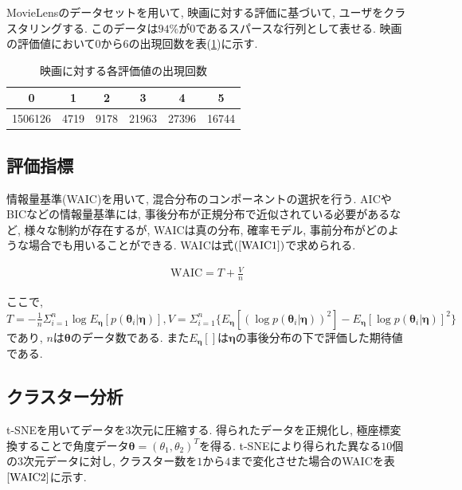 \documentclass[a4j,12pt]{jarticle}
\begin{document}
MovieLensのデータセットを用いて, 映画に対する評価に基づいて, ユーザをクラスタリングする. このデータは$94\%$が$0$であるスパースな行列として表せる. 映画の評価値において$0$から$6$の出現回数を表(\ref{MovieLens3})に示す.

\begin{table}[tbp]
\begin{center}
\caption{映画に対する各評価値の出現回数}   %
\label{MovieLens3}   %
\begin{tabular}{c c c c c c}
\hline
0 & 1 & 2 & 3 & 4 & 5 \\ \hline \hline
1506126 & 4719 & 9178 & 21963 & 27396 & 16744 \\ \hline
\end{tabular}
\end{center}
\end{table}

\subsection{評価指標}

情報量基準(WAIC)を用いて, 混合分布のコンポーネントの選択を行う. AICやBICなどの情報量基準には, 事後分布が正規分布で近似されている必要があるなど, 様々な制約が存在するが, WAICは真の分布, 確率モデル, 事前分布がどのような場合でも用いることができる. WAICは式$(\ref{WAIC1})$で求められる.

\begin{eqnarray}
\label{WAIC1}
\mbox{WAIC} = T + \frac{V}{n}
\end{eqnarray}

\noindent
ここで, $T = - \frac{1}{n} \Sigma^n_{i=1} \log E_{\bm \eta}[p(\bm \theta_i| \bm \eta)], 
V = \Sigma^n_{i=1} \{ E_{\bm \eta}[(\log p(\bm \theta_i| \bm \eta))^2] - E_{\bm \eta}[\log p(\bm \theta_i| \bm \eta)]^2 \}$であり, $n$は$\bm \theta$のデータ数である. また$E_{\bm \eta}[ ]$は$\bm \eta$の事後分布の下で評価した期待値である.  

\subsection{クラスター分析}

t-SNEを用いてデータを3次元に圧縮する. 得られたデータを正規化し, 極座標変換することで角度データ$\bm \theta = (\theta_1, \theta_2)^T$を得る. t-SNEにより得られた異なる$10$個の$3$次元データに対し, クラスター数を$1$から$4$まで変化させた場合のWAICを表$\ref{WAIC2}$に示す. 
\end{document}
